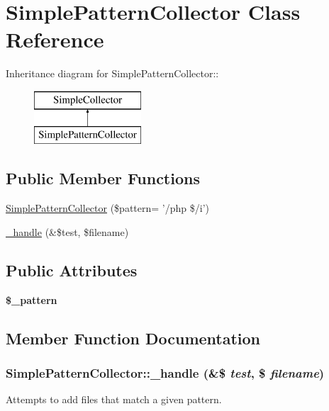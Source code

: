 \hypertarget{class_simple_pattern_collector}{
\section{SimplePatternCollector Class Reference}
\label{class_simple_pattern_collector}
}
Inheritance diagram for SimplePatternCollector::\begin{figure}[H]
\begin{center}
\leavevmode
\includegraphics[height=2cm]{class_simple_pattern_collector}
\end{center}
\end{figure}
\subsection*{Public Member Functions}
\begin{DoxyCompactItemize}
\item 
\hyperlink{class_simple_pattern_collector_a8d0a4aeab51275b3bae2ddd577341fc0}{SimplePatternCollector} (\$pattern= '/php \$/i')
\item 
\hyperlink{class_simple_pattern_collector_a862100ed3f4249ef9360f473aa95e75d}{\_\-handle} (\&\$test, \$filename)
\end{DoxyCompactItemize}
\subsection*{Public Attributes}
\begin{DoxyCompactItemize}
\item 
\hypertarget{class_simple_pattern_collector_ab0a290f119dd37e08c4f202b4881a949}{
{\bfseries \$\_\-pattern}}
\label{class_simple_pattern_collector_ab0a290f119dd37e08c4f202b4881a949}

\end{DoxyCompactItemize}


\subsection{Member Function Documentation}
\hypertarget{class_simple_pattern_collector_a862100ed3f4249ef9360f473aa95e75d}{
\subsubsection[{\_\-handle}]{\setlength{\rightskip}{0pt plus 5cm}SimplePatternCollector::\_\-handle (\&\$ {\em test}, \/  \$ {\em filename})}}
\label{class_simple_pattern_collector_a862100ed3f4249ef9360f473aa95e75d}
Attempts to add files that match a given pattern.

